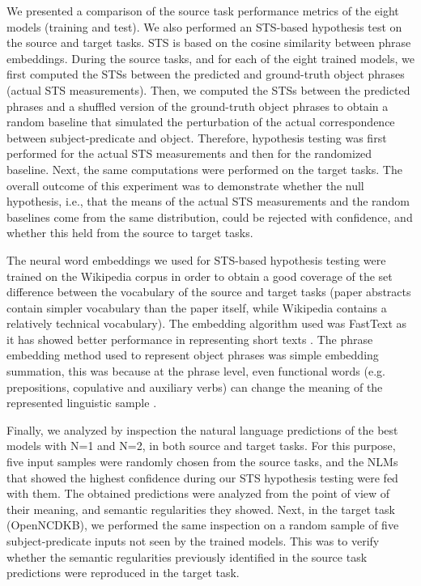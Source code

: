 \documentclass[preprint]{elsarticle}
\begin{document}
We presented a comparison of the source task performance metrics of the eight models (training and test). We also performed an STS-based hypothesis test on the source and target tasks. STS is based on the cosine similarity between phrase embeddings. During the source tasks, and for each of the eight trained models, we first computed the STSs between the predicted and ground-truth object phrases (actual STS measurements). Then, we computed the STSs between the predicted phrases and a shuffled version of the ground-truth object phrases to obtain a random baseline that simulated the perturbation of the actual correspondence between subject-predicate and object. Therefore, hypothesis testing was first performed for the actual STS measurements and then for the randomized baseline. Next, the same computations were performed on the target tasks. The overall outcome of this experiment was to demonstrate whether the null hypothesis, i.e., that the means of the actual STS measurements and the random baselines come from the same distribution, could be rejected with confidence, and whether this held from the source to target tasks.

The neural word embeddings we used for STS-based hypothesis testing were trained on the Wikipedia corpus in order to obtain a good coverage of the set difference between the vocabulary of the source and target tasks (paper abstracts contain simpler vocabulary than the paper itself, while  Wikipedia contains a relatively technical vocabulary). The embedding algorithm used was FastText as it has showed better performance in representing short texts \cite{bojanowski2017enriching}. The phrase embedding method used to represent object phrases was simple embedding summation, this was because at the phrase level, even functional words (e.g. prepositions, copulative and auxiliary verbs) can change the meaning of the represented linguistic sample \cite{arroyo2019unsupervised}.

Finally, we analyzed by inspection the natural language predictions of the best models with N=1 and N=2, in both source and target tasks. For this purpose, five input samples were randomly chosen from the source tasks, and the NLMs that showed the highest confidence during our STS hypothesis testing were fed with them. The obtained predictions were analyzed from the point of view of their meaning, and semantic regularities they showed. Next, in the target task (OpenNCDKB), we performed the same inspection on a random sample of five subject-predicate inputs not seen by the trained models. This was to verify whether the semantic regularities previously identified in the source task predictions were reproduced in the target task.
\end{document}
